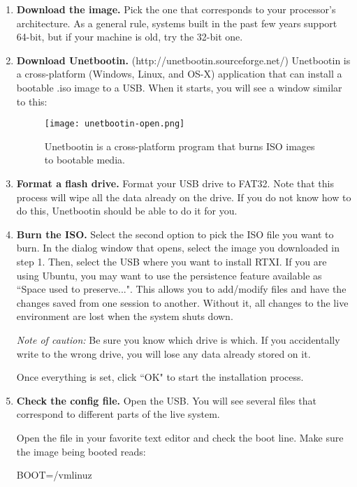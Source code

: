 \begin{enumerate}
\item \textbf{Download the image.} Pick the one that corresponds to your processor's architecture. As a general rule, systems built in the past few years support 64-bit, but if your machine is old, try the 32-bit one. 

\item \textbf{Download Unetbootin.} (http://unetbootin.sourceforge.net/) Unetbootin is a cross-platform (Windows, Linux, and OS-X) application that can install a bootable .iso image to a USB. When it starts, you will see a window similar to this:

\begin{figure}[h]
\begin{center}
\texttt{[image: unetbootin-open.png]}
\caption[Unetbootin]{Unetbootin is a cross-platform program that burns ISO images to bootable media.}
\end{center}
\end{figure}

\item \textbf{Format a flash drive.} Format your USB drive to FAT32. Note that this process will wipe all the data already on the drive. If you do not know how to do this, Unetbootin should be able to do it for you. 

\item \textbf{Burn the ISO.} Select the second option to pick the ISO file you want to burn. In the dialog window that opens, select the image you downloaded in step 1. Then, select the USB where you want to install RTXI. If you are using Ubuntu, you may want to use the persistence feature available as ``Space used to preserve...". This allows you to add/modify files and have the changes saved from one session to another. Without it, all changes to the live environment are lost when the system shuts down.

\textit{Note of caution:} Be sure you know which drive is which. If you accidentally write to the wrong drive, you will lose any data already stored on it. 

Once everything is set, click ``OK" to start the installation process. 

\item \textbf{Check the config file.} Open the USB. You will see several files that correspond to different parts of the live system. 

Open the file in your favorite text editor and check the boot line. Make sure the image being booted reads: 
\begin{example}
BOOT=/vmlinuz
\end{example}


\end{enumerate}
